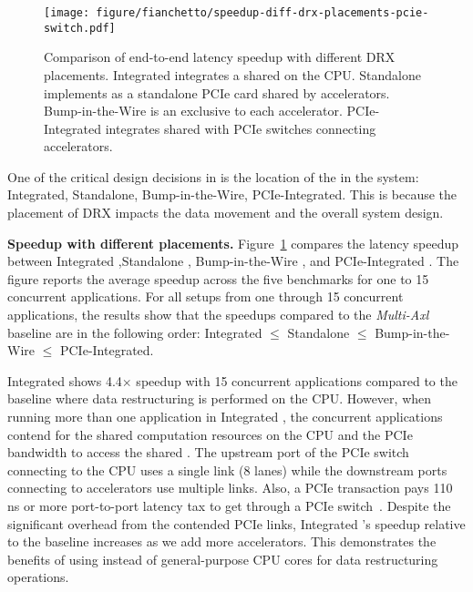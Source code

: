 \begin{figure}[t!]
    \centering
    \texttt{[image: figure/fianchetto/speedup-diff-drx-placements-pcie-switch.pdf]}
    \caption[Comparison of end-to-end latency speedup with different DRX placements.]{Comparison of end-to-end latency speedup with different DRX placements. 
    Integrated \drx integrates a shared \drx on the CPU. 
    Standalone \drx implements \drx as a standalone PCIe card shared by accelerators. 
    Bump-in-the-Wire \drx is an exclusive \drx to each accelerator.
    PCIe-Integrated \drx integrates shared \drxs with PCIe switches connecting accelerators.
    }
    \label{fig:res:speedup-drx-placement}
\end{figure}


\noindent One of the critical design decisions in \dmx is the location of the \drx in the system: Integrated, Standalone, Bump-in-the-Wire, PCIe-Integrated. 
%
This is because the placement of DRX impacts the data movement and the overall system design.
%

%
\noindent \textbf{Speedup with different \drx placements.}
%
Figure~\ref{fig:res:speedup-drx-placement} compares the latency speedup between Integrated \drx,Standalone \drx, Bump-in-the-Wire \drx, and PCIe-Integrated \drx.
%
The figure reports the average speedup across the five benchmarks for one to 15 concurrent applications.
%
For all setups from one through 15 concurrent applications, the results show that the speedups compared to the \emph{Multi-Axl} baseline are in the following order: Integrated $\leq$ Standalone $\leq$ Bump-in-the-Wire $\leq$ PCIe-Integrated. 

%
Integrated \drx shows 4.4$\times$ speedup with 15 concurrent applications compared to the baseline where data restructuring is performed on the CPU.
%
However, when running more than one application in Integrated \drx, the concurrent applications contend for the shared \drx computation resources on the CPU and the PCIe bandwidth to access the shared \drx. 
%
The upstream port of the PCIe switch connecting to the CPU uses a single link (8 lanes) while the downstream ports connecting to accelerators use multiple links.
%
Also, a PCIe transaction pays 110 ns or more port-to-port latency tax to get through a PCIe switch~\cite{broadcom:pcie-switches}. 
%
Despite the significant overhead from the contended PCIe links, Integrated \drx's speedup relative to the baseline increases as we add more accelerators.
%
This demonstrates the benefits of using \drx instead of general-purpose CPU cores for data restructuring operations.

